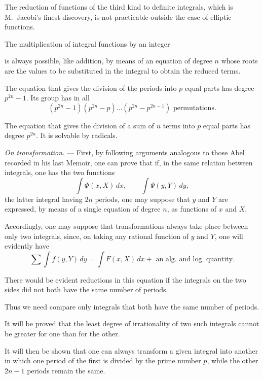 The reduction of functions of the third kind to definite integrals,
which is M.~Jacobi's finest discovery, is not practicable outside the
case of elliptic functions.

The multiplication of integral functions by an integer


is always possible, like addition, by means of an equation of degree
$n$ whose roots are the values to be substituted in the integral to
obtain the reduced terms.

The equation that gives the division of the periods into $p$ equal
parts has degree $p^{2n}-1$. Its group has in all
\[
(p^{2n}-1)(p^{2n}-p)\ldots(p^{2n}-p^{2n-1})\text{ permutations.}
\]

The equation that gives the division of a sum of $n$ terms into $p$
equal parts has degree $p^{2n}$. It is solvable by radicals.

\emph{On transformation.} --- First, by following arguments analogous
to those Abel recorded in his last Memoir, one can prove that if, in
the same relation between integrals, one has the two functions
\[
\int \Phi(x,X)\,dx,\qquad \int \Psi(y,Y)\,dy,
\]
the latter integral having $2n$ periods, one may suppose that $y$ and
$Y$ are expressed, by means of a single equation of degree $n$, as
functions of $x$ and $X$.

Accordingly, one may suppose that transformations always take place
between only two integrals, since, on taking any rational function of
$y$ and $Y$, one will evidently have
\[
\sum\!\int f(y,Y)\,dy=\int F(x,X)\,dx+\text{ an alg. and log. quantity.}
\]

There would be evident reductions in this equation if the integrals on
the two sides did not both have the same number of periods.

Thus we need compare only integrals that both have the same number of
periods.

It will be proved that the least degree of irrationality of two such
integrals cannot be greater for one than for the other.

It will then be shown that one can always transform a given integral
into another in which one period of the first is divided by the prime
number $p$, while the other $2n-1$ periods remain the same.


